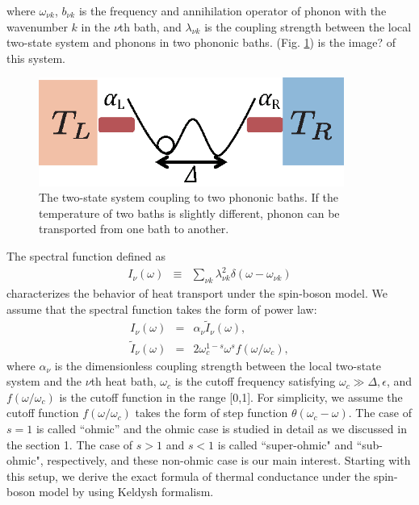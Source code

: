 where $\omega_{\nu k}$, $b_{\nu k}$ is the frequency and annihilation operator of phonon with the wavenumber $k$ in the $\nu$th bath, and $\lambda_{\nu k}$ is the coupling strength between the local two-state system and phonons in two phononic baths.
(Fig. \ref{fig:system_image}) is the image? of this system.
\begin{figure}[tb]
	\centering
	\includegraphics[width=100mm]{system_image.eps}
	\caption{The two-state system coupling to two phononic baths. If the temperature of two baths is slightly different, phonon can be transported from one bath to another.}
	\label{fig:system_image}
\end{figure}
The spectral function defined as  
\begin{eqnarray}
	I_{\nu}(\omega)&\equiv&\sum_{\nu k} \lambda_{\nu k}^2\delta(\omega-\omega_{\nu k})
\end{eqnarray}
characterizes the behavior of heat transport under the spin-boson model.
We assume that the spectral function takes the form of power law:
\begin{eqnarray}
	I_{\nu}(\omega)&=&\alpha_\nu \tilde{I}_\nu (\omega), \label{spect} \\
	\tilde{I}_\nu(\omega)&=&2\omega_c^{1-s}\omega^s f(\omega/\omega_c),
\end{eqnarray}
where $\alpha_{\nu}$ is the dimensionless coupling strength between the local two-state system and the $\nu$th heat bath, $\omega_c$ is the cutoff frequency satisfying $\omega_c\gg\Delta,\epsilon$, and $f(\omega/\omega_c)$ is the cutoff function in the range [0,1]. For simplicity, we assume the cutoff function $f(\omega/\omega_c)$ takes the form of step function $\theta(\omega_c-\omega)$.
The case of $s=1$ is called ``ohmic'' and the ohmic case is studied in detail as we discussed in the section 1. 
The case of $s>1$ and $ s<1$ is called ``super-ohmic" and ``sub-ohmic", respectively, 
and these non-ohmic case is our main interest.
Starting with this setup, we derive the exact formula of thermal conductance under the spin-boson model by using Keldysh formalism.
 
